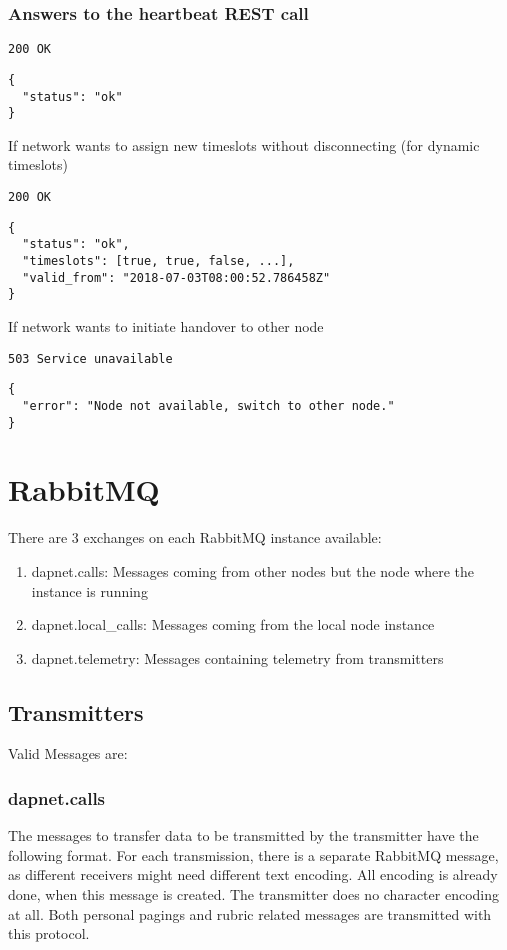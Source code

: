 \subsubsection{Answers to the heartbeat REST call}
\texttt{200 OK}
\begin{lstlisting}
{
  "status": "ok"
}
\end{lstlisting}

If network wants to assign new timeslots without disconnecting (for dynamic timeslots)

\texttt{200 OK}
\begin{lstlisting}
{
  "status": "ok",
  "timeslots": [true, true, false, ...],
  "valid_from": "2018-07-03T08:00:52.786458Z"
}
\end{lstlisting}

If network wants to initiate handover to other node

\texttt{503 Service unavailable}
\begin{lstlisting}
{
  "error": "Node not available, switch to other node."
}
\end{lstlisting}

\section{RabbitMQ}
\label{protocoldef:RabbitMQ}
There are 3 exchanges on each RabbitMQ instance available:
\begin{enumerate}
\item dapnet.calls: Messages coming from other nodes but the node where the instance is running
\item dapnet.local\_calls: Messages coming from the local node instance
\item dapnet.telemetry: Messages containing telemetry from transmitters
\end{enumerate}


\subsection{Transmitters}
\label{protocoldef:RabbitMQ:Transmitters}

Valid Messages are:

\subsubsection{dapnet.calls}
\label{protocoldef:RabbitMQ:dapnet.calls}
The messages to transfer data to be transmitted by the transmitter have the following format.
For each transmission, there is a separate RabbitMQ message, as different receivers might need different text encoding. All encoding is already done, when this message is created. The transmitter does no character encoding at all. Both personal pagings and rubric related messages are transmitted with this protocol.

